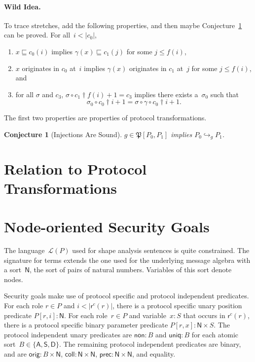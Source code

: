 \documentclass[12pt]{article}
\newtheorem{conj}[thm]{Conjecture}
\newcommand{\srt}[1]{\ensuremath{\mathsf{#1}}}
\newcommand{\typ}{\mathbin:}
\newcommand{\prefix}[2]{#1\dagger#2}
\newcommand{\alg}[1]{\ensuremath{\mathfrak{#1}}}
\newcommand{\lang}{\mathcal{L}}
\newcommand{\role}{\mathsf{r}}
\begin{document}
\paragraph{Wild Idea.}
To trace stretches, add the following properties, and then maybe
Conjecture~\ref{conj: injections are sound} can be proved.
For all~$i<|c_0|$, 
\begin{enumerate}
\item $x\sqsubseteq c_0(i)$ implies $\gamma(x)\sqsubseteq
  c_1(j)$ for some $j\leq f(i)$,
\item $x$ originates in $c_0$ at~$i$ implies $\gamma(x)$ originates in
  $c_1$ at~$j$ for some $j\leq f(i)$, and
\item for all $\sigma$ and $c_3$, $\sigma\circ\prefix{c_1}{f(i)+1}=c_3$
  implies there exists a~$\sigma_0$ such that
  \[\sigma_0\circ\prefix{c_0}{i+1}=
  \sigma\circ\gamma\circ\prefix{c_0}{i+1}.\]
\end{enumerate}
The first two properties are properties of protocol transformations.

\begin{conj}[Injections Are Sound]\label{conj: injections are sound}
  $g\in\alg{P}[P_0,P_1]$ implies $P_0\hookrightarrow_g P_1$.
\end{conj}

\section{Relation to Protocol Transformations}
\label{sec:protocol transformations}



\newpage
\section{Node-oriented Security Goals}

The language~$\lang(P)$ used for shape analysis sentences is quite
constrained.  The signature for terms extends the one used for the
underlying message algebra with a sort~$\srt{N}$, the sort of pairs of
natural numbers.  Variables of this sort denote nodes.

Security goals make use of protocol specific and protocol independent
predicates.  For each role $r\in P$ and $i<|\role^c(r)|$,
there is a protocol specific unary position predicate
$P[r,i]\typ\srt{N}$.  For each role~$r\in P$ and variable~$x\typ S$
that occurs in $\role^c(r)$, there is a protocol specific binary
parameter predicate $P[r,x]\typ\srt{N}\times S$.  The protocol
independent unary predicates are $\mathsf{non}\typ B$ and
$\mathsf{uniq}\typ B$ for each atomic sort~$B\in\{\srt{A},
\srt{S},\srt{D}\}$.  The remaining protocol independent predicates are
binary, and are $\mathsf{orig}\typ B\times\srt{N}$,
$\mathsf{coll}\typ\srt{N}\times\srt{N}$,
$\mathsf{prec}\typ\srt{N}\times\srt{N}$, and equality.
\end{document}
